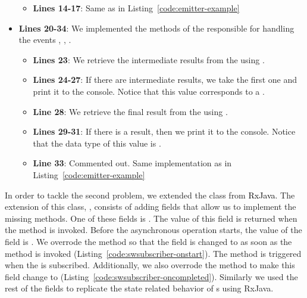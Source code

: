 \documentclass[type=bsc,accentcolor=tud9c]{tudthesis}
\newcommand{\framework}[1]{\textcolor{black}{#1}}
\begin{document}
\begin{itemize}
\begin{itemize}
		\item {\bf Lines 14-17}: Same as in Listing~\ref{code:emitter-example}
		\end{itemize}
	\item {\bf Lines 20-34}: We implemented the methods of the  responsible for handling the events , , .
		\begin{itemize}
			\item {\bf Lines 23}: We retrieve the intermediate results from the  using .
			\item {\bf Lines 24-27}: If there are intermediate results, we take the first one and print it to the console. Notice that this value corresponds to a .
			\item {\bf Line 28}: We retrieve the final result from the  using .
			\item {\bf Lines 29-31}: If there is a result, then we print it to the console. Notice that the data type of this value is .
			\item {\bf Line 33}: Commented out. Same implementation as in Listing~\ref{code:emitter-example}
		\end{itemize}
\end{itemize}





In order to tackle the second problem, we extended the class  from \framework{RxJava}. The extension of this class, , consists of adding fields that allow us to implement the missing methods. One of these fields is . The value of this field is returned when the method  is invoked. Before the asynchronous operation starts, the value of the field is . We overrode the method  so that the field  is changed to  as soon as the method is invoked (Listing~\ref{code:swsubscriber-onstart}). The method  is triggered when the  is subscribed. Additionally, we also overrode the method  to make this field change to  (Listing~\ref{code:swsubscriber-oncompleted}). Similarly we used the rest of the fields to replicate the state related behavior of s using RxJava.
\end{document}
